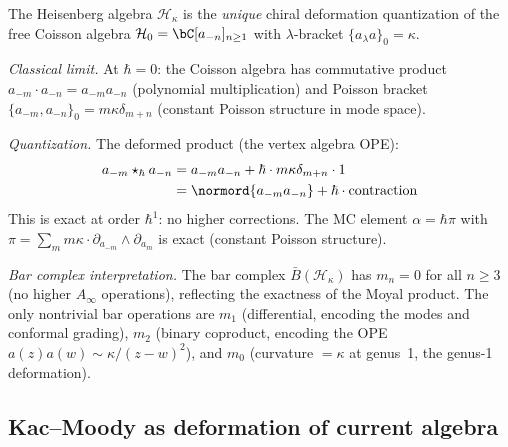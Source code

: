 \begin{computation}
\label{comp:moyal-chiral}

The Heisenberg algebra $\mathcal{H}_\kappa$ is the
\emph{unique} chiral deformation quantization of the free
Coisson algebra $\mathcal{H}_0 = \bC[a_{-n}]_{n \geq 1}$
with $\lambda$-bracket $\{a_\lambda a\}_0 = \kappa$.

\emph{Classical limit.}
At $\hbar = 0$: the Coisson algebra has commutative product
$a_{-m} \cdot a_{-n} = a_{-m} a_{-n}$ (polynomial multiplication)
and Poisson bracket $\{a_{-m}, a_{-n}\}_0 = m\kappa\delta_{m+n}$
(constant Poisson structure in mode space).

\emph{Quantization.}
The deformed product (the vertex algebra OPE):
\begin{align*}
a_{-m} \star_\hbar a_{-n}
&= a_{-m} a_{-n} + \hbar \cdot m\kappa\delta_{m+n} \cdot 1 \\
&= \normord{a_{-m} a_{-n}} + \hbar \cdot
\text{contraction}
\end{align*}
This is exact at order $\hbar^1$: no higher corrections.
The MC element $\alpha = \hbar \pi$ with
$\pi = \sum_m m\kappa \cdot \partial_{a_{-m}} \wedge
\partial_{a_m}$ is exact (constant Poisson structure).

\emph{Bar complex interpretation.}
The bar complex $\bar{B}(\mathcal{H}_\kappa)$ has
$m_n = 0$ for all $n \geq 3$ (no higher $A_\infty$ operations),
reflecting the exactness of the Moyal product. The only
nontrivial bar operations are $m_1$ (differential, encoding the modes and conformal grading), $m_2$ (binary coproduct, encoding the OPE $a(z)a(w) \sim \kappa/(z-w)^2$), and $m_0$ (curvature $= \kappa$ at genus~1, the genus-1 deformation).
\end{computation}

\subsection{Kac--Moody as deformation of current algebra}

